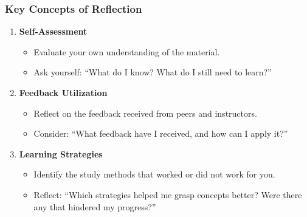 \documentclass[aspectratio=169]{beamer}
\begin{document}
\begin{frame}[fragile]
    \frametitle{Key Concepts of Reflection}
    \begin{enumerate}
        \item \textbf{Self-Assessment} 
        \begin{itemize}
            \item Evaluate your own understanding of the material.
            \item Ask yourself: ``What do I know? What do I still need to learn?''
        \end{itemize}

        \item \textbf{Feedback Utilization} 
        \begin{itemize}
            \item Reflect on the feedback received from peers and instructors.
            \item Consider: ``What feedback have I received, and how can I apply it?''
        \end{itemize}

        \item \textbf{Learning Strategies} 
        \begin{itemize}
            \item Identify the study methods that worked or did not work for you.
            \item Reflect: ``Which strategies helped me grasp concepts better? Were there any that hindered my progress?''
        \end{itemize}
    \end{enumerate}
\end{frame}
\end{document}

